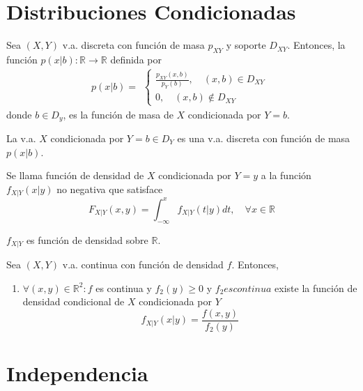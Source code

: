 \section{Distribuciones Condicionadas}

\begin{defn}
  Sea $(X,Y)$ v.a. discreta con función de masa $p_{XY}$ y soporte $D_{XY}$. Entonces, la función $p(x|b) : \mathbb{R} \to \mathbb{R}$ definida por
  \[ 
    p(x|b) =
    \begin{aligned}
      \begin{cases}
        \frac{p_{XY}(x, b)}{p_{Y}(b)}, \quad (x, b) \in D_{XY} \\
        0, \quad (x, b) \not \in D_{XY}
      \end{cases}
    \end{aligned} 
  \] 
  donde $b \in D_{y}$, es la función de masa de $X$ condicionada por $Y = b$.
\end{defn}

\begin{theo}
  La v.a. $X$ condicionada por $Y=b \in D_{Y}$ es una v.a. discreta con función de masa $p(x|b)$.
\end{theo}

\begin{defn}
  Se llama función de densidad de $X$ condicionada por $Y = y$ a la función $f_{X|Y}(x|y)$ no negativa que satisface
  \[ 
    F_{X|Y}(x,y) = \int_{- \infty}^{x} f_{X|Y}(t|y) dt, \quad \forall x \in \mathbb{R}
  \] 
\end{defn}

\begin{obs}
  $f_{X|Y}$ es función de densidad sobre $\mathbb{R}$.
\end{obs}

\begin{theo}
  Sea $(X,Y)$ v.a. continua con función de densidad $f$. Entonces,
  \begin{enumerate}[label=(\roman*)]
    \item $\forall (x,y) \in \mathbb{R}^{2} : f$ es continua y $f_{2}(y) \geq 0$ y $f_{2} es continua$ existe la función de densidad condicional de $X$ condicionada por $Y$ 
      \[ 
        f_{X|Y}(x | y) = \frac{f(x,y)}{f_{2}(y)}
      \] 
  \end{enumerate}
\end{theo}

\section{Independencia}


